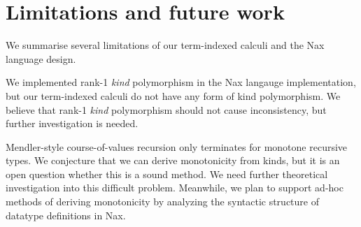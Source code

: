 
\section{Limitations and future work}\label{sec:concl:fw}
We summarise several limitations of our term-indexed calculi and
the Nax language design.

We implemented rank-1 {\it kind} polymorphism
in the Nax langauge implementation, but our term-indexed calculi
do not have any form of kind polymorphism. We believe that
rank-1 {\it kind} polymorphism should not cause inconsistency,
but further investigation is needed.

Mendler-style course-of-values recursion only terminates for monotone
recursive types. We conjecture that we can derive monotonicity from kinds,
but it is an open question whether this is a sound method. We need further
theoretical investigation into this difficult problem.
Meanwhile, we plan to support ad-hoc methods of deriving monotonicity
by analyzing the syntactic structure of datatype definitions in Nax.

